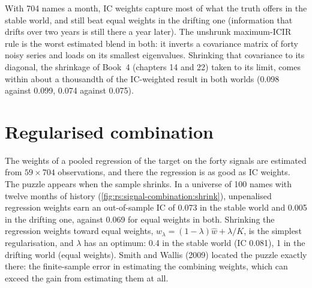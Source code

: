 With 704 names a month, IC weights capture most of what the truth offers in the stable world, and still beat equal weights in the drifting
one (information that drifts over two years is still there a year later). The unshrunk maximum-ICIR rule is the worst estimated blend in both:
it inverts a covariance matrix of forty noisy series and loads on its smallest eigenvalues. Shrinking that covariance to its diagonal, the shrinkage of Book~4 (chapters 14 and 22) taken to its limit, comes within about a thousandth of the IC-weighted result in both worlds (0.098 against 0.099, 0.074 against 0.075).

\section{Regularised combination}

The weights of a pooled regression of the target on the forty signals are estimated from $59 \times 704$ observations, and there the
regression is as good as IC weights. The puzzle appears when the sample shrinks. In a universe of 100 names with twelve months of history
(\cref{fig:rs:signal-combination:shrink}), unpenalised regression weights earn an out-of-sample IC of 0.073 in the stable world and 0.005 in
the drifting one, against 0.069 for equal weights in both. Shrinking the regression weights toward equal weights,
$w_\lambda = (1 - \lambda)\hat w + \lambda/K$, is the simplest regularisation, and $\lambda$ has an optimum: 0.4 in the stable world (IC 0.081),
1 in the drifting world (equal weights). Smith and Wallis (2009) located the puzzle exactly there: the finite-sample error in estimating the
combining weights, which can exceed the gain from estimating them at all.

